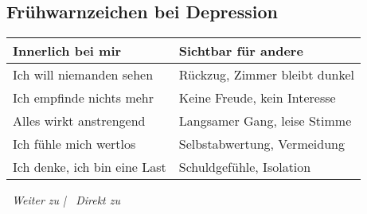 \subsection*{\textcolor{ctmmBlue}{Frühwarnzeichen bei Depression}}

\begin{tabular}{|p{7cm}|p{7cm}|}
\hline
\textbf{Innerlich bei mir} & \textbf{Sichtbar für andere} \\
\hline
Ich will niemanden sehen & Rückzug, Zimmer bleibt dunkel \\
Ich empfinde nichts mehr & Keine Freude, kein Interesse \\
Alles wirkt anstrengend & Langsamer Gang, leise Stimme \\
Ich fühle mich wertlos & Selbstabwertung, Vermeidung \\
Ich denke, ich bin eine Last & Schuldgefühle, Isolation \\
\hline
\end{tabular}

\vspace{1cm}
\begin{center}
\textit{\textcolor{ctmmGreen}{\faChevronRight~Weiter zu}  | \textcolor{ctmmRed}{\faHeart~Direkt zu} }
\end{center}

